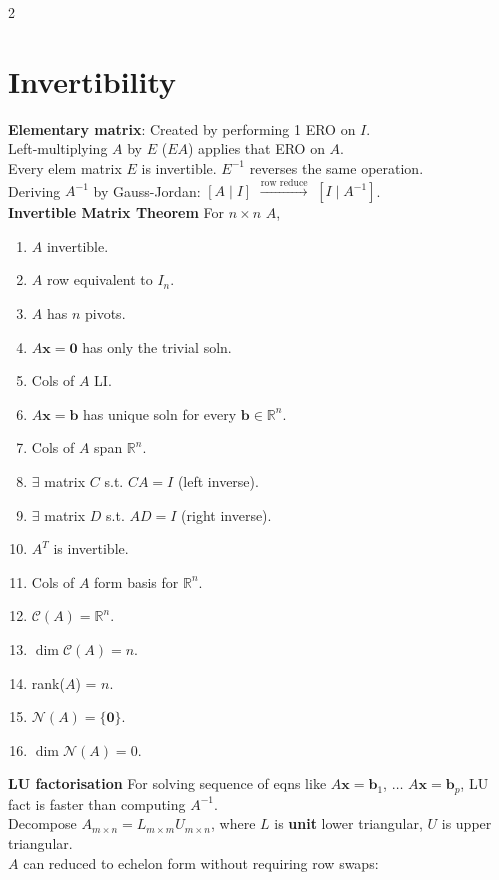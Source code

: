 \documentclass[10pt]{article}
\begin{document}
\begin{multicols*}{2}
\section*{Invertibility}
\textbf{Elementary matrix}: Created by performing 1 ERO on $I$.\\
Left-multiplying $A$ by $E$ ($EA$) applies that ERO on $A$.\\
Every elem matrix $E$ is invertible. $E^{-1}$ reverses the same operation.\\
Deriving $A^{-1}$ by Gauss-Jordan: $[A \mid I]$ $\xrightarrow{\text{row reduce}}$ $[I \mid A^{-1}]$.\\
\textbf{Invertible Matrix Theorem} For $n \times n$ $A$,
\begin{enumerate}
    \item $A$ invertible.
    \item $A$ row equivalent to $I_n$.
    \item $A$ has $n$ pivots.
    \item $A\mathbf{x}=\mathbf{0}$ has only the trivial soln.
    \item Cols of $A$ LI.
    \item $A\mathbf{x}=\mathbf{b}$ has unique soln for every $\mathbf{b}\in\mathbb{R}^n$.
    \item Cols of $A$ span $\mathbb{R}^n$.
    \item $\exists$ matrix $C$ s.t. $CA=I$ (left inverse).
    \item $\exists$ matrix $D$ s.t. $AD=I$ (right inverse).
    \item $A^T$ is invertible.
    \item Cols of $A$ form basis for $\mathbb{R}^n$.
    \item $\mathcal{C}(A)=\mathbb{R}^n$.
    \item $\dim \mathcal{C}(A) = n$.
    \item rank($A$) = $n$.
    \item $\mathcal{N}(A) = \{\mathbf{0}\}$.
    \item $\dim \mathcal{N}(A) = 0$.
\end{enumerate}
\textbf{LU factorisation} For solving sequence of eqns like $A\mathbf{x}=\mathbf{b}_1$, $\ldots$ $A\mathbf{x}=\mathbf{b}_p$, LU fact is faster than computing $A^{-1}$.\\
Decompose $A_{m\times n} = L_{m \times m}U_{m \times n}$, where $L$ is \textbf{unit} lower triangular, $U$ is upper triangular.\\
$A$ can reduced to echelon form without requiring row swaps:

\end{multicols*}
\end{document}
